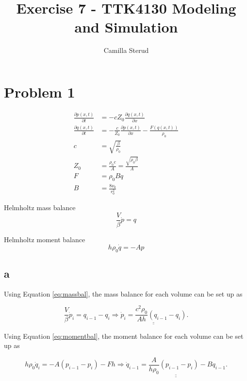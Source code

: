 \documentclass{article}
\title{Exercise 7 - TTK4130 Modeling and Simulation}
\author{Camilla Sterud}
\date{}
\begin{document}
\maketitle

\newpage

\section{Problem 1}

\begin{align*}
    \frac{\partial p(x,t)}{\partial t} &= -c Z_0 \frac{\partial q(x,t)}{\partial x}\\
    \frac{\partial q(x,t)}{\partial t} &= -\frac{c}{Z_0} \frac{\partial p(x,t)}{\partial x} - \frac{F(q(x,t))}{\rho_0}\\
    c &= \sqrt{\frac{\beta}{\rho_0}}\\
    Z_0 &= \frac{\rho_0 c}{A} = \frac{\sqrt{\rho_0\beta}}{A}\\
    F &= \rho_0Bq\\
    B &= \frac{8\nu_0}{r_0^2} 
\end{align*}

Helmholtz mass balance 
\begin{equation}\label{eq:massbal}
    \frac{V}{\beta} \dot p = q
\end{equation}

Helmholtz moment balance 
\begin{equation}\label{eq:momentbal}
    h\rho_0\dot q = -Ap
\end{equation}

\subsection{a}

Using Equation \ref{eq:massbal}, the mass balance for each volume can be set up as

\begin{equation*}
    \frac{V}{\beta}\dot p_i = q_{i-1} - q_i \Rightarrow \underline{\underline{\dot p_i = \frac{c^2\rho_0}{Ah}(q_{i-1} - q_i)}}.
\end{equation*}

Using Equation \ref{eq:momentbal}, the moment balance for each volume can be set up as


\begin{equation*}
    h\rho_0\dot q_i = -A(p_{i-1} - p_i) - Fh \Rightarrow \underline{\underline{\dot q_{i-1} = \frac{A}{h\rho_0}(p_{i-1} - p_i) - Bq_{i-1}}}.
\end{equation*}
\end{document}
